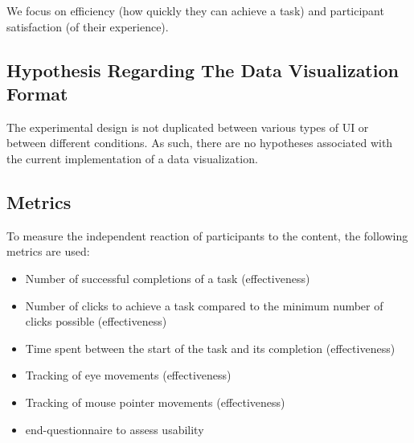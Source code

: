 \documentclass[twocolumn, letterpaper,13pt]{scrartcl}
\begin{document}
    We focus on efficiency (how quickly they can achieve a task) and participant satisfaction (of their experience).

    \subsection*{Hypothesis Regarding The Data Visualization Format}
 
    The experimental design is not duplicated between various types of UI or between different conditions. As such, there are no hypotheses associated with the current implementation of a data visualization. 
 
    \subsection*{Metrics}
    
    To measure the independent reaction of participants to the content, the following metrics are used:
    
    \begin{itemize}
        \item Number of successful completions of a task (effectiveness)
        \item Number of clicks to achieve a task compared to the minimum number of clicks possible (effectiveness)
        \item Time spent between the start of the task and its completion (effectiveness)
        \item Tracking of eye movements (effectiveness)
        \item Tracking of mouse pointer movements (effectiveness)
        \item end-questionnaire to assess usability
    \end{itemize}
    
\end{document}
